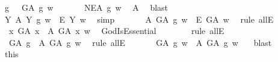 \begin{isabellebody}
\ g\ \ {}{\isacharcolon}\ {\isachardoublequoteopen}G\isactrlsup A\ g\ w{\isachardoublequoteclose}\ \isacommand{{\isachardot}{\isachardot}}\isamarkupfalse%
\isanewline
\ \ \ \ \isamarkupfalse%
\ {\isachardoublequoteopen}NE\isactrlsup A\ g\ w{\isachardoublequoteclose}\ \isamarkupfalse%
\ A{}\ \isamarkupfalse%
\ blast\ \ \ \ \ \ \ \ \ \ \ \ \ \ \ \ \ \ %
\isanewline
\ \ \ \ \isamarkupfalse%
\ {\isachardoublequoteopen}{\isasymforall}Y{\isachardot}\ {\isacharparenleft}{\isasymE}\isactrlsup A\ Y\ g\ w{\isacharparenright}\ {\isasymlongrightarrow}\ {\isacharparenleft}\isactrlbold {\isasymbox}\isactrlbold {\isasymexists}\isactrlsup E\ Y{\isacharparenright}\ w{\isachardoublequoteclose}\ \isamarkupfalse%
\ simp\isanewline
\ \ \ \ \isamarkupfalse%
\ {}{\isacharcolon}\ {\isachardoublequoteopen}{\isacharparenleft}{\isasymE}\isactrlsup A\ G\isactrlsup A\ g\ w{\isacharparenright}\ {\isasymlongrightarrow}\ {\isacharparenleft}\isactrlbold {\isasymbox}\isactrlbold {\isasymexists}\isactrlsup E\ G\isactrlsup A{\isacharparenright}\ w{\isachardoublequoteclose}\ \isamarkupfalse%
\ {\isacharparenleft}rule\ allE{\isacharparenright}\isanewline
\ \ \ \ \isamarkupfalse%
\ \ {\isachardoublequoteopen}{\isacharparenleft}\isactrlbold {\isasymforall}x{\isachardot}\ G\isactrlsup A\ x\ \isactrlbold {\isasymrightarrow}\ {\isacharparenleft}{\isasymE}\isactrlsup A\ G\isactrlsup A\ x{\isacharparenright}{\isacharparenright}\ w{\isachardoublequoteclose}\ \isamarkupfalse%
\ GodIsEssential\isanewline
\ \ \ \ \ \ \isamarkupfalse%
\ {\isacharparenleft}rule\ allE{\isacharparenright}\ %
\isanewline
\ \ \ \ \isamarkupfalse%
\ \ {\isachardoublequoteopen}{\isacharparenleft}G\isactrlsup A\ g\ \isactrlbold {\isasymrightarrow}\ {\isacharparenleft}{\isasymE}\isactrlsup A\ G\isactrlsup A\ g{\isacharparenright}{\isacharparenright}\ w{\isachardoublequoteclose}\ \isamarkupfalse%
\ {\isacharparenleft}rule\ allE{\isacharparenright}\isanewline
\ \ \ \ \isamarkupfalse%
\ \ {\isachardoublequoteopen}G\isactrlsup A\ g\ w\ {\isasymlongrightarrow}\ {\isasymE}\isactrlsup A\ G\isactrlsup A\ g\ w{\isachardoublequoteclose}\ \ \isamarkupfalse%
\ blast\isanewline
\ \ \ \ \isamarkupfalse%
\ this\ {}\ \isamarkupfalse%

\end{isabellebody}
